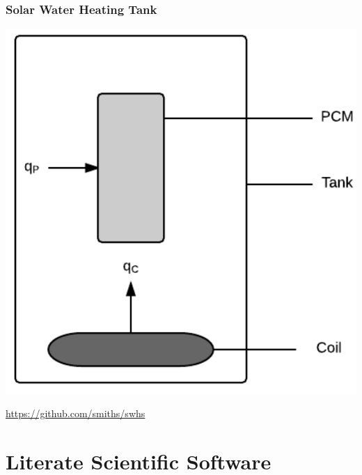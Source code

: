 \documentclass{beamer}
\begin{document}
\begin{frame}

\frametitle{Solar Water Heating Tank}

\begin{center}
\includegraphics[scale=0.45]{Tank.pdf}
\end{center}

\href{https://github.com/smiths/swhs}{https://github.com/smiths/swhs}

\end{frame}


\section[Lit.\ SS]{Literate Scientific Software}

\end{document}
